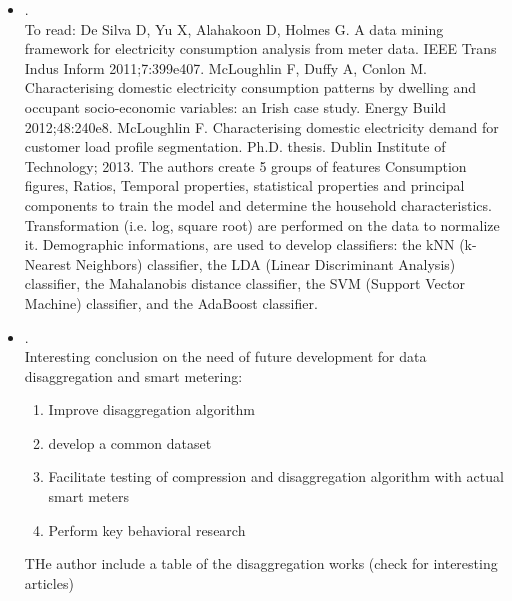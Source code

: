 \begin{itemize}
	\item {}.\\
	 To read: De Silva D, Yu X, Alahakoon D, Holmes G. A data mining framework for electricity consumption analysis from meter data. IEEE Trans Indus Inform 2011;7:399e407.
	 McLoughlin F, Duffy A, Conlon M. Characterising domestic electricity consumption patterns by dwelling and occupant socio-economic variables: an Irish case study. Energy Build 2012;48:240e8.
	 McLoughlin F. Characterising domestic electricity demand for customer load profile segmentation. Ph.D. thesis. Dublin Institute of Technology; 2013.
	 The authors create 5 groups of features Consumption figures, Ratios, Temporal properties, statistical properties and principal components to train the model and determine the household characteristics. Transformation (i.e. log, square root) are performed on the data to normalize it. Demographic informations, are used to develop classifiers: the kNN (k-Nearest Neighbors) classifier, the LDA (Linear Discriminant Analysis) classifier, the Mahalanobis distance classifier, the SVM (Support Vector Machine) classifier, and the AdaBoost classifier.
	\item {}.\\
	 Interesting conclusion on the need of future development for data disaggregation and smart metering:
	 \begin{enumerate}
	 \item Improve disaggregation algorithm
	 \item develop a common dataset
	 \item Facilitate testing of compression and disaggregation algorithm with actual smart meters
	 \item Perform key behavioral research
	 \end{enumerate}
	  THe author include a table of the disaggregation works (check for interesting articles)
\end{itemize}